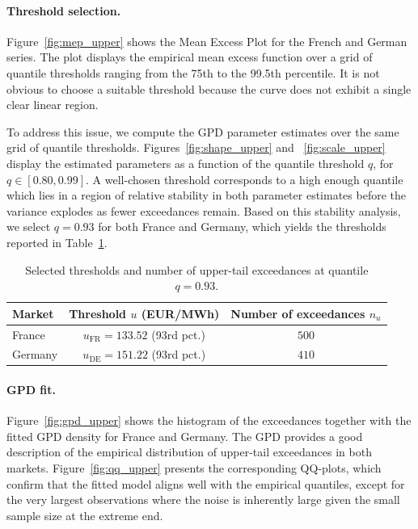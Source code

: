 \paragraph{Threshold selection.}
Figure~\ref{fig:mep_upper} shows the Mean Excess Plot for the French and German series.
The plot displays the empirical mean excess function over a grid of quantile thresholds
ranging from the 75th to the 99.5th percentile. It is not obvious to choose a suitable threshold because
the curve does not exhibit a single clear linear region.

To address this issue, we compute the GPD parameter estimates over the same grid of quantile thresholds. 
Figures~\ref{fig:shape_upper} and ~\ref{fig:scale_upper} display the estimated parameters as a function of the quantile 
threshold $q$, for $q \in [0.80, 0.99]$. A well-chosen threshold corresponds to a high enough quantile which lies in
a region of relative stability in both
parameter estimates before the variance explodes as fewer exceedances remain. Based on
this stability analysis, we select $q = 0.93$ for both France and Germany, which yields
the thresholds reported in Table~\ref{tab:thresholds_upper}.

\begin{table}[H]
\centering
\caption{Selected thresholds and number of upper-tail exceedances at quantile $q = 0.93$.}
\label{tab:thresholds_upper}
\begin{tabular}{lcc}
\hline
Market & Threshold $u$ (EUR/MWh) & Number of exceedances $n_u$ \\
\hline
France     & $u_{\mathrm{FR}} = 133.52 $  (93rd pct.) & $ 500$ \\
Germany    & $u_{\mathrm{DE}} = 151.22 $  (93rd pct.) & $ 410$ \\
\hline
\end{tabular}
\end{table}

\paragraph{GPD fit.}
Figure~\ref{fig:gpd_upper} shows the histogram of the exceedances together with the
fitted GPD density for France and Germany. The GPD provides a good description of the
empirical distribution of upper-tail exceedances in both markets. Figure~\ref{fig:qq_upper}
presents the corresponding QQ-plots, which confirm that the fitted model aligns well
with the empirical quantiles, except for the very largest observations where the noise
is inherently large given the small sample size at the extreme end.

